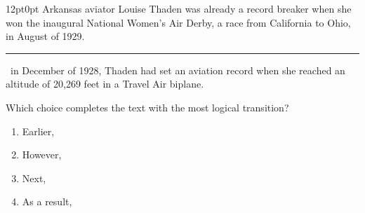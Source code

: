 \documentclass[11pt, twocolumn]{article}
\newcounter{questionnum}
\begin{document}
\vspace{6pt}\noindent
\begin{minipage}{\columnwidth}\raggedright
\noindent{}\par\vspace{8pt}
\begin{adjustwidth}{12pt}{0pt}
Arkansas aviator Louise Thaden was already a record breaker when she won the inaugural National Women's Air Derby, a race from California to Ohio, in August of 1929. \,\rule{2cm}{0.4pt}\, in December of 1928, Thaden had set an aviation record when she reached an altitude of 20,269 feet in a Travel Air biplane.
\vspace{6pt}

Which choice completes the text with the most logical transition?
\begin{enumerate}[label=\Alph*),leftmargin=18pt,topsep=3pt,itemsep=2pt]
  \item Earlier,
  \item However,
  \item Next,
  \item As a result,
\end{enumerate}
\end{adjustwidth}
\end{minipage}\par
\end{document}
